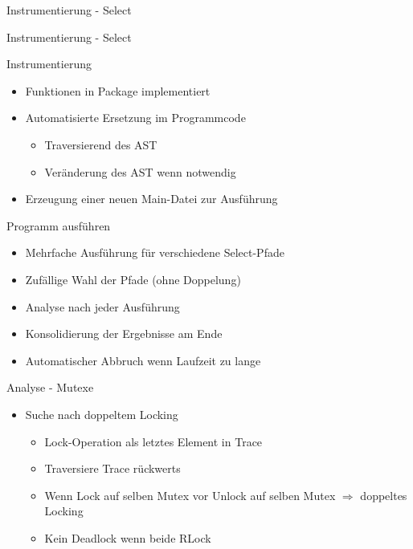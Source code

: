 \documentclass[aspectratio=169]{beamer}  %
\begin{document}
\begin{frame}{Instrumentierung - Select}
  
\end{frame}

\begin{frame}{Instrumentierung - Select}
  
\end{frame}

\begin{frame}{Instrumentierung}
  \begin{itemize}
    \item Funktionen in Package implementiert
    \item Automatisierte Ersetzung im Programmcode
    \begin{itemize}
      \item Traversierend des AST
      \item Veränderung des AST wenn notwendig
    \end{itemize}
    \item Erzeugung einer neuen Main-Datei zur Ausführung
  \end{itemize}
\end{frame}


\begin{frame}{Programm ausführen}
  \begin{itemize}
    \item Mehrfache Ausführung für verschiedene Select-Pfade
    \item Zufällige Wahl der Pfade (ohne Doppelung)
    \item Analyse nach jeder Ausführung
    \item Konsolidierung der Ergebnisse am Ende
    \item Automatischer Abbruch wenn Laufzeit zu lange
  \end{itemize}
\end{frame}


\begin{frame}{Analyse - Mutexe}
  \begin{itemize}
    \item Suche nach doppeltem Locking
    \begin{itemize}
      \item Lock-Operation als letztes Element in Trace
      \item Traversiere Trace rückwerts
      \item Wenn Lock auf selben Mutex vor Unlock auf selben Mutex $\Rightarrow$ doppeltes Locking
      \item Kein Deadlock wenn beide RLock
    \end{itemize}
  \end{itemize}
\end{frame}
\end{document}
